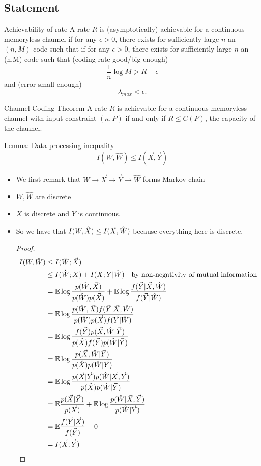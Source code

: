 \documentclass[../main.tex]{subfiles}
\begin{document}
\subsection{Statement}
\begin{gbox}{Achievability of rate}
    A rate $R$ is (asymptotically) achievable for a continuous memoryless channel if for any $\epsilon>0$, there exists for sufficiently large $n$ an $(n,M)$ code such that if for any $\epsilon > 0$, there exists for sufficiently large $n$ an (n,M) code such that (coding rate good/big enough)\[
    \frac{1}{n}\log M > R-\epsilon
    \] and 
    (error small enough) \[
    \lambda_{max} < \epsilon.
    \]
\end{gbox}
\begin{bbox}{Channel Coding Theorem}
    A rate $R$ is achievable for a continuous memoryless channel with input constraint $(\kappa, P)$ if and only if $R\leq C(P)$, the capacity of the channel.
\end{bbox}

\begin{bbox}{Lemma: Data processing inequality}
    \[
    I(W,\hat W) \leq I(\vec X,\vec Y)
    \]
    \begin{itemize}
        \item We first remark that $W\to \vec X\to \vec Y\to \hat W$ forms Markov chain
        \item $W,\hat W$ are discrete
        \item $X$ is discrete and $Y$ is continuous. 
        \item So we have that $I(W,\hat X)\leq I(\vec X,\hat W)$ because everything here is discrete.
        \begin{proof}
            \begin{align*}
                I(W,\hat W) &\leq I(\hat W;\vec X)\\
                &\leq I(\hat W; X) + I(X;Y|\hat W) \quad\text{by non-negativity of mutual information}\\
                &= \mathbb{E} \log\frac{p(\hat W, \vec X)}{p(\hat W)p(\vec X)} + \mathbb{E} \log\frac{f(\vec Y|\vec X,\hat W)}{f(\vec Y|\hat W)}\\
                &=\mathbb{E} \log\frac{p(\hat W, \vec X)f(\vec Y|\vec X,\hat W)}{p(\hat W)p(\vec X)f(\vec Y|\hat W)}\\
                &=\mathbb{E} \log\frac{f(\vec Y)p(\vec X,\hat W|\vec Y)}{p(\hat X)f(\vec Y)p(\hat W|\vec Y)}\\
                &= \mathbb{E} \log\frac{p(\vec X,\hat W|\vec Y)}{p(\hat X)p(\hat W|\vec Y)}\\
                &= \mathbb{E} \log \frac{p(\vec X|\vec Y)p(\hat W|\vec X,\vec Y)}{p(\hat X)p(\hat W|\vec Y)}\\
                &= \mathbb{E} \frac{p(\vec X|\vec Y)}{p(\vec X)} + \mathbb{E} \log \frac{p(\hat W|\vec X,\vec Y)}{p(\hat W|\vec Y)} \\
                &= \mathbb{E} \frac{f(\vec Y|\vec X)}{f(\vec Y)} + 0\\
                &= I(\vec X;\vec Y)
            \end{align*}
        \end{proof}
    \end{itemize}
\end{bbox}
\end{document}
